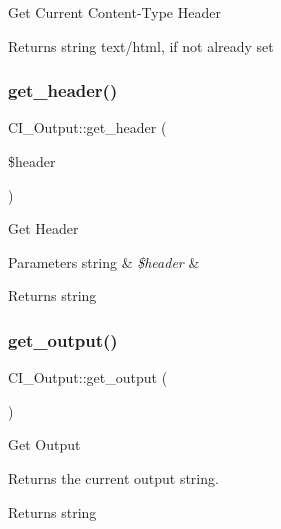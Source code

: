 Get Current Content-\/\+Type Header

\begin{DoxyReturn}{Returns}
string \textquotesingle{}text/html\textquotesingle{}, if not already set 
\end{DoxyReturn}
\mbox{\label{class_c_i___output_a4490c73a2b039abb14a1fc0202da1ec1}} 
\subsubsection{\texorpdfstring{get\+\_\+header()}{get\_header()}}
{\footnotesize\ttfamily C\+I\+\_\+\+Output\+::get\+\_\+header (\begin{DoxyParamCaption}\item[{}]{\$header }\end{DoxyParamCaption})}

Get Header


\begin{DoxyParams}[1]{Parameters}
string & {\em \$header} & \\
\hline
\end{DoxyParams}
\begin{DoxyReturn}{Returns}
string 
\end{DoxyReturn}
\mbox{\label{class_c_i___output_a3126fd4de0ed5dfb41d6965864b3390f}} 
\subsubsection{\texorpdfstring{get\+\_\+output()}{get\_output()}}
{\footnotesize\ttfamily C\+I\+\_\+\+Output\+::get\+\_\+output (\begin{DoxyParamCaption}{ }\end{DoxyParamCaption})}

Get Output

Returns the current output string.

\begin{DoxyReturn}{Returns}
string 
\end{DoxyReturn}
\mbox{\label{class_c_i___output_a4ec0624cc46657ef58f3b8a8a2fd8b4b}} 
